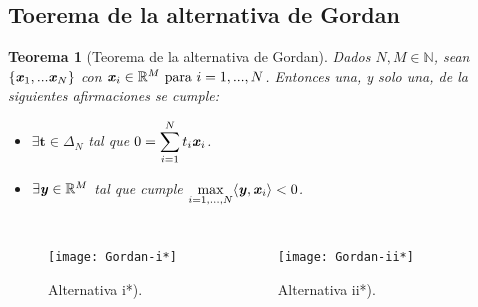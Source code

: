 \documentclass[9pt]{beamer}
\newtheorem{teorema}{Teorema}
\newcommand{\RR}{\mathbb{R}}
\newcommand{\NN}{\mathbb{N}}
\newcommand{\xx}{\textbf{\emph{x}}}
\newcommand{\yy}{\textbf{\emph{y}}}
\begin{document}
	\subsection{Toerema de la alternativa de Gordan}
		\begin{frame}[fragile]
			\begin{teorema}[Teorema de la alternativa de Gordan]\label{GordanClasic}
				Dados $N, M \in \NN   $, sean $ \{\xx_1,...\xx_N\}$ con $ \xx_i \in \RR^M \text{ para } i=1,...,N$. Entonces una, y solo una, de la siguientes afirmaciones se cumple:
				
				\begin{itemize}
					\item[i*)] $ \exists \mathbf{t} \in \Delta_N $ tal que  $  0 = \displaystyle \sum_{i=1}^{N}{t_i \xx_i}$.
					\item[ii*)] $ \exists \yy \in \RR^M $ tal que cumple $ \displaystyle \max_{i=1,...,N} \langle \yy, \xx_i \rangle < 0 $.
				\end{itemize}
			\end{teorema}
			\begin{columns}
				\begin{figure}[h!]
					\centering
					\texttt{[image: Gordan-i*]}
					\caption{Alternativa i*).}
				\end{figure}
				\begin{figure}[h!]
					\centering
					\texttt{[image: Gordan-ii*]}
					\caption{Alternativa ii*).}
				\end{figure} 
			\end{columns}
	
		\end{frame}
\end{document}
